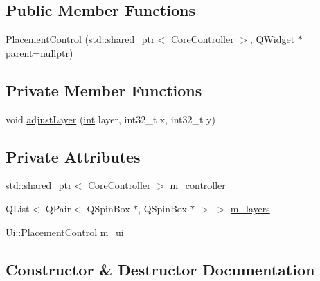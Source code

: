 \subsection*{Public Member Functions}
\begin{DoxyCompactItemize}
\item 
\mbox{\hyperlink{class_q_g_b_a_1_1_placement_control_a0636f6ceeeff0619130e8720e1cbd80b}{Placement\+Control}} (std\+::shared\+\_\+ptr$<$ \mbox{\hyperlink{class_q_g_b_a_1_1_core_controller}{Core\+Controller}} $>$, Q\+Widget $\ast$parent=nullptr)
\end{DoxyCompactItemize}
\subsection*{Private Member Functions}
\begin{DoxyCompactItemize}
\item 
void \mbox{\hyperlink{class_q_g_b_a_1_1_placement_control_a3ad4059487a2fa2c77a7c9705379f671}{adjust\+Layer}} (\mbox{\hyperlink{ioapi_8h_a787fa3cf048117ba7123753c1e74fcd6}{int}} layer, int32\+\_\+t x, int32\+\_\+t y)
\end{DoxyCompactItemize}
\subsection*{Private Attributes}
\begin{DoxyCompactItemize}
\item 
std\+::shared\+\_\+ptr$<$ \mbox{\hyperlink{class_q_g_b_a_1_1_core_controller}{Core\+Controller}} $>$ \mbox{\hyperlink{class_q_g_b_a_1_1_placement_control_a40e21b5a9cf3fdb1798c977dd79e6249}{m\+\_\+controller}}
\item 
Q\+List$<$ Q\+Pair$<$ Q\+Spin\+Box $\ast$, Q\+Spin\+Box $\ast$ $>$ $>$ \mbox{\hyperlink{class_q_g_b_a_1_1_placement_control_af046d4e3465f7f8d0b19578e3b60f9dd}{m\+\_\+layers}}
\item 
Ui\+::\+Placement\+Control \mbox{\hyperlink{class_q_g_b_a_1_1_placement_control_a7e1889bfb61d81fcb1a8896fb93c76a2}{m\+\_\+ui}}
\end{DoxyCompactItemize}


\subsection{Constructor \& Destructor Documentation}
\mbox{\label{class_q_g_b_a_1_1_placement_control_a0636f6ceeeff0619130e8720e1cbd80b}} 
